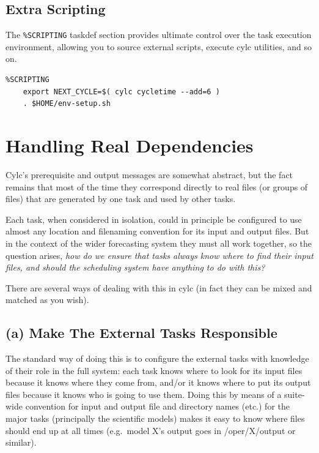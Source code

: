 \documentclass[11pt,a4paper]{article}
\begin{document}
\subsection{Extra Scripting}

The \lstinline=%SCRIPTING= taskdef section provides ultimate
control over the task execution environment, allowing you to source
external scripts, execute cylc utilities, and so on.

\begin{lstlisting}
%SCRIPTING
    export NEXT_CYCLE=$( cylc cycletime --add=6 )
    . $HOME/env-setup.sh
\end{lstlisting}

\pagebreak
\section{Handling Real Dependencies}
\label{HandlingRealDependencies}

Cylc's prerequisite and output messages are somewhat abstract, but the
fact remains that most of the time they correspond directly to real 
files (or groups of files) that are generated by one task and used by
other tasks.

Each task, when considered in isolation, could in principle be
configured to use almost any location and filenaming convention for its
input and output files. But in the context of the wider forecasting
system they must all work together, so the question arises, {\em how do
we ensure that tasks always know where to find their input files, and
should the scheduling system have anything to do with this?} 

There are several ways of dealing with this in cylc (in fact they can
be mixed and matched as you wish). 

\subsection{(a) Make The External Tasks Responsible }

The standard way of doing this is to configure the external tasks with
knowledge of their role in the full system: each task knows where to
look for its input files because it knows where they come from, and/or
it knows where to put its output files because it knows who is going to
use them. Doing this by means of a suite-wide convention for input and
output file and directory names (etc.) for the major tasks (principally
the scientific models) makes it easy to know where files should end up
at all times (e.g.\ model X's output goes in /oper/X/output or similar).
\end{document}
